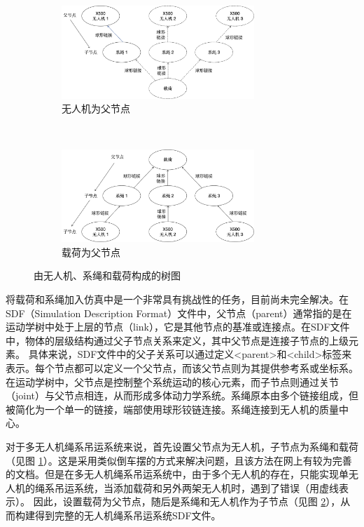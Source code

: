 \documentclass[lang=chs, degree=master, blindreview=true, winfonts=true]{yanputhesis}
\begin{document}
\begin{figure}[hbt!]
	\centering
	\begin{subfigure}[t]{0.9\textwidth}
		\centering
		\includegraphics[width=0.8\textwidth]{picture/tree2.png}
		\caption{无人机为父节点}
		\label{tree1}
	\end{subfigure}\\[2ex] %
	\begin{subfigure}[t]{0.9\textwidth}
		\centering
		\includegraphics[width=0.8\textwidth]{picture/tree1.png}
		\caption{载荷为父节点}
		\label{tree2}
	\end{subfigure}
	\caption{由无人机、系绳和载荷构成的树图}
	\label{tree_combined}
\end{figure}

将载荷和系绳加入仿真中是一个非常具有挑战性的任务，目前尚未完全解决。在SDF（Simulation Description Format）文件中，父节点（parent）通常指的是在运动学树中处于上层的节点（link），它是其他节点的基准或连接点。在SDF文件中，物体的层级结构通过父子节点关系来定义，其中父节点是连接子节点的上级元素。
具体来说，SDF文件中的父子关系可以通过定义<parent>和<child>标签来表示。每个节点都可以定义一个父节点，而该父节点则为其提供参考系或坐标系。在运动学树中，父节点是控制整个系统运动的核心元素，而子节点则通过关节（joint）与父节点相连，从而形成多体动力学系统。系绳原本由多个链接组成，但被简化为一个单一的链接，端部使用球形铰链连接。系绳连接到无人机的质量中心。

对于多无人机绳系吊运系统来说，首先设置父节点为无人机，子节点为系绳和载荷（见图 \ref{tree1}）。这是采用类似倒车摆的方式来解决问题，且该方法在网上有较为完善的文档。但是在多无人机绳系吊运系统中，由于多个无人机的存在，只能实现单无人机的绳系吊运系统，当添加载荷和另外两架无人机时，遇到了错误（用虚线表示）。
因此，设置载荷为父节点，随后是系绳和无人机作为子节点（见图 \ref{tree2}），从而构建得到完整的无人机绳系吊运系统SDF文件。
\end{document}
